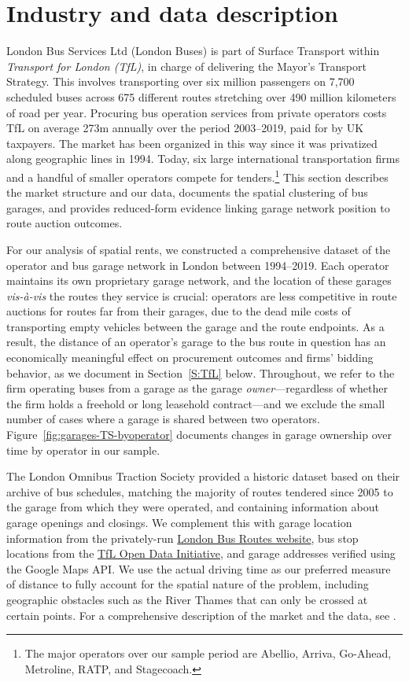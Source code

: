 \documentclass[12pt]{article}
\begin{document}
\section{Industry and data description}\label{S:Industry}
London Bus Services Ltd (London Buses) is part of Surface Transport within 
\emph{Transport for London (TfL)}, in charge of delivering the Mayor's 
Transport Strategy. This involves transporting over six million passengers on 
7,700 scheduled buses across 675 different routes stretching over 490 million 
kilometers of road per year. Procuring bus operation services from private 
operators costs TfL on average \textsterling 273m annually over the period 
2003--2019, paid for by UK taxpayers. The market has been organized in this 
way since it was privatized along geographic lines in 1994. Today, six large 
international transportation firms and a handful of smaller operators compete 
for tenders.\footnote{The major operators over our sample period are Abellio, Arriva, Go-Ahead, Metroline, RATP, and Stagecoach.} This section describes 
the market structure and our data, documents the spatial clustering of bus 
garages, and provides reduced-form evidence linking garage network position 
to route auction outcomes.

For our analysis of spatial rents, we constructed a comprehensive dataset of 
the operator and bus garage network in London between 1994--2019. Each operator 
maintains its own proprietary garage network, and the location of these garages 
\emph{vis-\`{a}-vis} the routes they service is crucial: operators are less 
competitive in route auctions for routes far from their garages, due to the 
dead mile costs of transporting empty vehicles between the garage and the route 
endpoints. As a result, the distance of an operator's garage to the bus route 
in question has an economically meaningful effect on procurement outcomes and 
firms' bidding behavior, as we document in Section~\ref{S:TfL} below. 
Throughout, we refer to the firm operating buses from a garage as the garage 
\emph{owner}---regardless of whether the firm holds a freehold or long 
leasehold contract---and we exclude the small number of cases where a garage 
is shared between two operators. Figure~\ref{fig:garages-TS-byoperator} documents changes in garage ownership over time by operator in our sample. 

The London Omnibus Traction Society provided a historic dataset based on their 
archive of bus schedules, matching the majority of routes tendered since 2005 
to the garage from which they were operated, and containing information about 
garage openings and closings. We complement this with garage location 
information from the privately-run \href{https://londonbuses.co.uk/}{London 
Bus Routes website}, bus stop locations from the \href{https://tfl.gov.uk/info-for/open-data-users/our-open-data}{TfL Open Data Initiative}, 
and garage addresses verified using the Google Maps API. We use the actual driving time as our preferred measure of distance to fully account for the spatial nature of the problem, including geographic obstacles such as the River Thames that can only be crossed at certain points. For a comprehensive 
description of the market and the data, see \cite{marra-oswald}.
\end{document}
